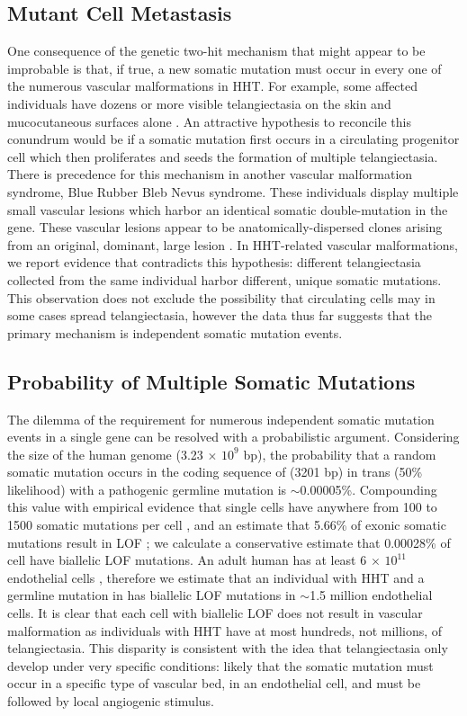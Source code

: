 \subsection{Mutant Cell Metastasis}
One consequence of the genetic two-hit mechanism that might appear to be improbable is that, if true, a new somatic mutation must occur in every one of the numerous vascular malformations in HHT. For example, some affected individuals have dozens or more visible telangiectasia on the skin and mucocutaneous surfaces alone \citep{gonzalez2019, letteboer2008, plauchu1989}.  An attractive hypothesis to reconcile this conundrum would be if a somatic mutation first occurs in a circulating progenitor cell which then proliferates and seeds the formation of multiple telangiectasia.  There is precedence for this mechanism in another vascular malformation syndrome, Blue Rubber Bleb Nevus syndrome.  These individuals display multiple small vascular lesions which harbor an identical somatic double-mutation in the  gene. These vascular lesions appear to be anatomically-dispersed clones arising from an original, dominant, large lesion \citep{soblet2017}. In HHT-related vascular malformations, we report evidence that contradicts this hypothesis: different telangiectasia collected from the same individual harbor different, unique somatic mutations. This observation does not exclude the possibility that circulating cells may in some cases spread telangiectasia, however the data thus far suggests that the primary mechanism is independent somatic mutation events. 

\subsection{Probability of Multiple Somatic Mutations}
The dilemma of the requirement for numerous independent somatic mutation events in a single gene can be resolved with a probabilistic argument. Considering the size of the human genome (3.23 $\times$ $10^9$ bp), the probability that a random somatic mutation occurs in the coding sequence of  (3201 bp) in trans (50\% likelihood) with a pathogenic  germline mutation is $\sim$0.00005\%. Compounding this value with empirical evidence that single cells have anywhere from 100 to 1500 somatic mutations per cell \citep{milholland2017, lodato2015, losardo2017}, and an estimate that 5.66\% of exonic somatic mutations result in LOF \citep{milholland2017}; we calculate a conservative estimate that 0.00028\% of cell have biallelic LOF  mutations. An adult human has at least 6 $\times$ $10^{11}$ endothelial cells \citep{sender2016}, therefore we estimate that an individual with HHT and a germline mutation in  has biallelic LOF  mutations in $\sim$1.5 million endothelial cells. It is clear that each cell with  biallelic LOF does not result in vascular malformation as individuals with HHT have at most hundreds, not millions, of telangiectasia. This disparity is consistent with the idea that telangiectasia only develop under very specific conditions: likely that the somatic mutation must occur in a specific type of vascular bed, in an endothelial cell, and must be followed by local angiogenic stimulus.  

